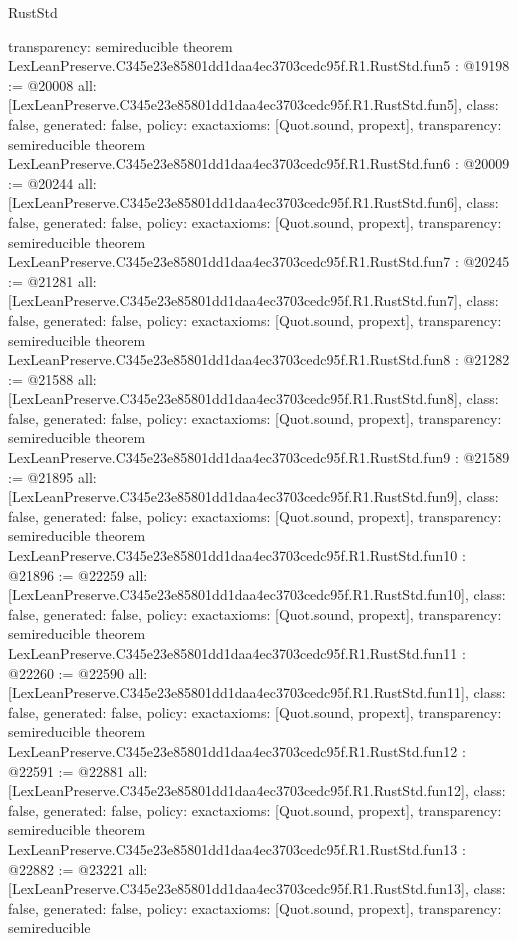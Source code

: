 \begin{lexlean}{RustStd}
\begin{coremodule}
{  transparency: semireducible
}
theorem LexLeanPreserve.C345e23e85801dd1daa4ec3703cedc95f.R1.RustStd.fun5 : @19198 := @20008 {
  all: [LexLeanPreserve.C345e23e85801dd1daa4ec3703cedc95f.R1.RustStd.fun5],
  class: false,
  generated: false,
  policy: exact{axioms: [Quot.sound, propext]},
  transparency: semireducible
}
theorem LexLeanPreserve.C345e23e85801dd1daa4ec3703cedc95f.R1.RustStd.fun6 : @20009 := @20244 {
  all: [LexLeanPreserve.C345e23e85801dd1daa4ec3703cedc95f.R1.RustStd.fun6],
  class: false,
  generated: false,
  policy: exact{axioms: [Quot.sound, propext]},
  transparency: semireducible
}
theorem LexLeanPreserve.C345e23e85801dd1daa4ec3703cedc95f.R1.RustStd.fun7 : @20245 := @21281 {
  all: [LexLeanPreserve.C345e23e85801dd1daa4ec3703cedc95f.R1.RustStd.fun7],
  class: false,
  generated: false,
  policy: exact{axioms: [Quot.sound, propext]},
  transparency: semireducible
}
theorem LexLeanPreserve.C345e23e85801dd1daa4ec3703cedc95f.R1.RustStd.fun8 : @21282 := @21588 {
  all: [LexLeanPreserve.C345e23e85801dd1daa4ec3703cedc95f.R1.RustStd.fun8],
  class: false,
  generated: false,
  policy: exact{axioms: [Quot.sound, propext]},
  transparency: semireducible
}
theorem LexLeanPreserve.C345e23e85801dd1daa4ec3703cedc95f.R1.RustStd.fun9 : @21589 := @21895 {
  all: [LexLeanPreserve.C345e23e85801dd1daa4ec3703cedc95f.R1.RustStd.fun9],
  class: false,
  generated: false,
  policy: exact{axioms: [Quot.sound, propext]},
  transparency: semireducible
}
theorem LexLeanPreserve.C345e23e85801dd1daa4ec3703cedc95f.R1.RustStd.fun10 : @21896 := @22259 {
  all: [LexLeanPreserve.C345e23e85801dd1daa4ec3703cedc95f.R1.RustStd.fun10],
  class: false,
  generated: false,
  policy: exact{axioms: [Quot.sound, propext]},
  transparency: semireducible
}
theorem LexLeanPreserve.C345e23e85801dd1daa4ec3703cedc95f.R1.RustStd.fun11 : @22260 := @22590 {
  all: [LexLeanPreserve.C345e23e85801dd1daa4ec3703cedc95f.R1.RustStd.fun11],
  class: false,
  generated: false,
  policy: exact{axioms: [Quot.sound, propext]},
  transparency: semireducible
}
theorem LexLeanPreserve.C345e23e85801dd1daa4ec3703cedc95f.R1.RustStd.fun12 : @22591 := @22881 {
  all: [LexLeanPreserve.C345e23e85801dd1daa4ec3703cedc95f.R1.RustStd.fun12],
  class: false,
  generated: false,
  policy: exact{axioms: [Quot.sound, propext]},
  transparency: semireducible
}
theorem LexLeanPreserve.C345e23e85801dd1daa4ec3703cedc95f.R1.RustStd.fun13 : @22882 := @23221 {
  all: [LexLeanPreserve.C345e23e85801dd1daa4ec3703cedc95f.R1.RustStd.fun13],
  class: false,
  generated: false,
  policy: exact{axioms: [Quot.sound, propext]},
  transparency: semireducible
}
\end{coremodule}
\end{lexlean}

